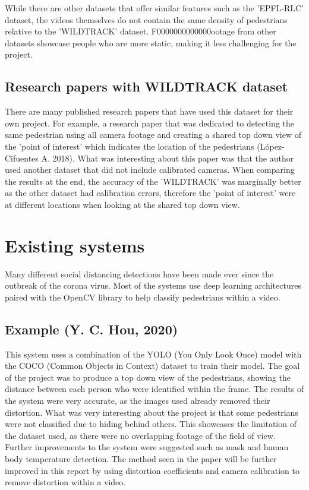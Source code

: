\documentclass[12pt]{report}
\begin{document}
\vspace{2mm}

While there are other datasets that offer similar features such as the 'EPFL-RLC' dataset, the videos themselves do not contain the same density of pedestrians relative to the 'WILDTRACK' dataset. F0000000000000ootage from other datasets showcase people who are more static, making it less challenging for the project.

\subsection{Research papers with WILDTRACK dataset}

There are many published research papers that have used this dataset for their own project. For example, a research paper that was dedicated to detecting the same pedestrian using all camera footage and creating a shared top down view of the 'point of interest' which indicates the location of the pedestrians (López-Cifuentes A. 2018). What was interesting about this paper was that the author used another dataset that did not include calibrated cameras. When comparing the results at the end, the accuracy of the 'WILDTRACK' was marginally better as the other dataset had calibration errors, therefore the 'point of interest' were at different locations when looking at the shared top down view.


\section{Existing systems}

Many different social distancing detections have been made ever since the outbreak of the corona virus. Most of the systems use deep learning architectures paired with the OpenCV library to help classify pedestrians within a video.

\subsection{Example (Y. C. Hou, 2020)}

This system uses a combination of the YOLO (You Only Look Once) model with the COCO (Common Objects in Context) dataset to train their model. The goal of the project was to produce a top down view of the pedestrians, showing the distance between each person who were identified within the frame. The results of the system were very accurate, as the images used already removed their distortion. What was very interesting about the project is that some pedestrians were not classified due to hiding behind others. This showcases the limitation of the dataset used, as there were no overlapping footage of the field of view. Further improvements to the system were suggested such as mask and human body temperature detection. The method seen in the paper will be further improved in this report by using distortion coefficients and camera calibration to remove distortion within a video.
\end{document}

